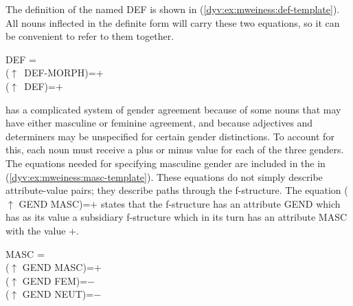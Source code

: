 \documentclass[output=paper]{langsci/langscibook}
\begin{document}
The definition of the  named \textsf{DEF} is shown in (\ref{dyv:ex:mweiness:def-template}).
All nouns inflected in the definite form will carry these two equations, so it can be convenient to refer to them together.

\ea\label{dyv:ex:mweiness:def-template}
{\sffamily 
DEF = \\
\hspace{2em}  ($\uparrow$~DEF-MORPH)=$+$ \\
\hspace{2em}  ($\uparrow$~DEF)=$+$ \\
}
\z



 has a complicated system of gender agreement because of some nouns that may have either masculine or feminine agreement, and because adjectives and determiners may be unspecified for certain gender distinctions.
To account for this, each noun must receive a plus or minus value for each of the three genders.
The equations needed for specifying masculine gender are included in the  in (\ref{dyv:ex:mweiness:masc-template}).
These equations do not simply describe attribute-value pairs; they describe paths through the f-structure.
The equation \textsf{($\uparrow$ GEND MASC)=$+$} states that the f-structure has an attribute \textsf{GEND} which has as its value a subsidiary f-structure which in its turn has an attribute \textsf{MASC} with the value \textsf{$+$}.

\ea\label{dyv:ex:mweiness:masc-template}
{\sffamily 
MASC = \\
\hspace{2em}  ($\uparrow$ GEND MASC)=$+$ \\
\hspace{2em}  ($\uparrow$ GEND FEM)=$-$ \\
\hspace{2em}  ($\uparrow$ GEND NEUT)=$-$ \\
}
\z
\end{document}
